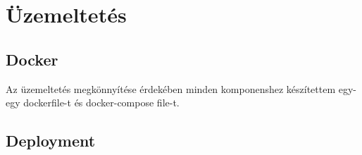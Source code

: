 \chapter{Üzemeltetés}

\section{Docker}
Az üzemeltetés megkönnyítése érdekében minden komponenshez készítettem egy-egy dockerfile-t és docker-compose file-t.

\section{Deployment}

